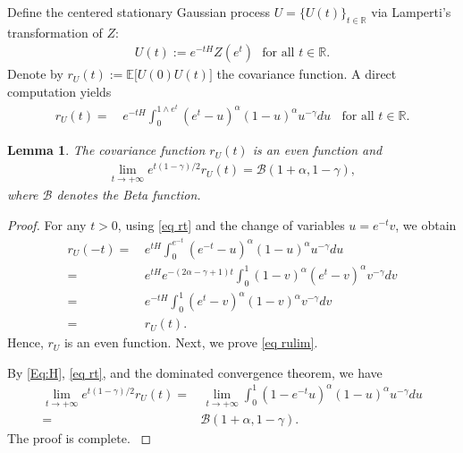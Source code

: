 \documentclass[11pt, reqno]{amsart}
\numberwithin{equation}{section}
\newtheorem{lemma}{Lemma}[section]
\newcommand{\1}{{\bf 1}}
\newcommand{\2}{{\bf 2}}
\begin{document}
Define the centered stationary Gaussian process $U =\{U (t)\}_{t\in\mathbb R}$ via  Lamperti's transformation of $Z$:
 \begin{align*}%
 U(t):=e^{-tH} Z\left(e^t\right)  \ \ \ \text{for all } t\in \mathbb R.
 \end{align*}
 {Denote by   $r_U(t):=\mathbb E \big[U (0)U (t)\big]$   the covariance function.  A direct computation yields 
 \begin{align}\label{eq rt}
 r_U(t)=&\, e^{-tH}\int_0^{1\wedge e^t}\left(e^t-u\right)^{\alpha}(1-u)^{\alpha} u^{-\gamma}du \ \ \ \ \text{for all } t\in \mathbb R.
 \end{align}}
       \begin{lemma}\label{lem ru}  {
 The covariance function $r_U(t)$  is an even function and
    \begin{align}\label{eq rulim}
  \lim_{t\rightarrow +\infty} e^{t(1-\gamma)/2} r_U(t)   =\mathcal B(1+\alpha, 1-\gamma),
    \end{align}
    where $\mathcal B$ denotes the Beta function.    }
 \end{lemma}
  \begin{proof} 
    {
     For any $t>0$,  using \eqref{eq rt} and the change of variables $u=e^{-t}v$, we obtain}
    {     \begin{align*}   
 r_U(-t)=&\, e^{tH} \int_0^{e^{-t}} \left(e^{-t}-u\right)^{\alpha} (1-u)^{\alpha} u^{-\gamma}du \\
 =&\,  e^{tH} e^{-(2\alpha-\gamma+1)t} \int_0^{1} \left(1- v \right)^{\alpha}\left(e^{t}-v\right)^{\alpha}  v^{-\gamma} dv\\
 =&\, e^{-tH}  \int_0^{1}  \left(e^{t}-v\right)^{\alpha}  \left(1- v \right)^{\alpha} v^{-\gamma} dv\\
 =&\, r_U(t).
 \end{align*} }
       {Hence, $r_U$ is an even function.}  {Next, we prove \eqref{eq rulim}.}
      
          {By  \eqref{Eq:H}, \eqref{eq rt}, and the dominated convergence theorem, we have}
     {          \begin{align*}  
     \lim_{t\rightarrow +\infty}   e^{t(1-\gamma)/2}  r_U(t)  
     = &\,  \lim_{t\rightarrow +\infty}    \int_0^{1}  \left(1-e^{-t}u\right)^{\alpha}  \left(1- u \right)^{\alpha} u^{-\gamma} du\\
     = &   \mathcal B(1+\alpha, 1-\gamma).
      \end{align*}}
        {The proof is complete. }
  \end{proof}
  
\end{document}
